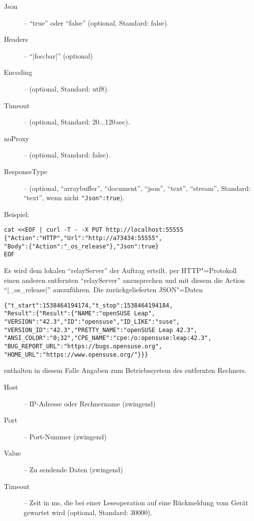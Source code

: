 \documentclass[titlepage=false,toc=nobibliography]{vl-report}
\newcommand*\theServer{relayServer}
\newcommand*\action[1]{\fbox{\nolinkurl{#1}}\medskip\par}
\begin{document}
\begin{description}
\begin{description}
\begin{description}
        \item[Json] -- "`true"' oder "`false"' (optional, Standard: false).
        \item[Headers] -- "`|{foo:bar}|"' (optional)
        \item[Encoding] -- (optional, Standard: utf8).
        \item[Timeout] -- (optional, Standard: 20...120\,sec).
        \item[noProxy] -- (optional, Standard: false).
        \item[ResponseType ] -- (optional, "`arraybuffer"', "`document"', 
          "`json"', "`text"', "`stream"', Standard: "`text"', wenn nicht 
          \verb|"Json":true|).

      \end{description}
Beispiel:
\begin{lstlisting}[language={}]
cat <<EOF | curl -T - -X PUT http://localhost:55555
{"Action":"HTTP","Url":"http://a73434:55555",
"Body":{"Action":"_os_release"},"Json":true}
EOF
\end{lstlisting}
Es wird dem lokalen "`\theServer"' der Auftrag erteilt, per HTTP"=Protokoll 
einen anderen entfernten "`\theServer"' anzusprechen und mit diesem die Action  
"`|_os_release|"' auszuführen. Die zurückgelieferten JSON"=Daten
\begin{lstlisting}[language={}]
{"t_start":1538464194174,"t_stop":1538464194184,
"Result":{"Result":{"NAME":"openSUSE Leap",
"VERSION":"42.3","ID":"opensuse","ID_LIKE":"suse",
"VERSION_ID":"42.3","PRETTY_NAME":"openSUSE Leap 42.3",
"ANSI_COLOR":"0;32","CPE_NAME":"cpe:/o:opensuse:leap:42.3",
"BUG_REPORT_URL":"https://bugs.opensuse.org",
"HOME_URL":"https://www.opensuse.org/"}}}
\end{lstlisting}
enthalten in diesem Falle Angaben zum Betriebssystem des entfernten Rechners.

    \item \action{UDP}

      \begin{description}

        \item[Host] -- IP-Adresse oder Rechnername (zwingend)

        \item[Port] -- Port-Nummer (zwingend)

        \item[Value] -- Zu sendende Daten (zwingend)
        
        \item[Timeout] -- Zeit in ms, die bei einer Leseoperation auf eine
        Rückmeldung vom Gerät gewartet wird (optional, Standard: 30000).


\end{description}
\end{description}
\end{description}
\end{document}
